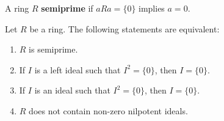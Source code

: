 




\begin{definition}
	A ring $R$ \textbf{semiprime} if 
	$aRa=\{0\}$ implies $a=0$.
\end{definition}

\begin{proposition}
	Let $R$ be a ring. The following statements are equivalent: 
	\begin{enumerate}
		\item $R$ is semiprime.
		\item If $I$ is a left ideal such that $I^2=\{0\}$, then $I=\{0\}$.
		\item If $I$ is an ideal such that $I^2=\{0\}$, then $I=\{0\}$.
		\item $R$ does not contain non-zero nilpotent ideals.
	\end{enumerate}
\end{proposition}

